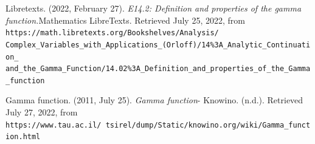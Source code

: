 \documentclass[12pt]{report}
\begin{document}
\begin{thebibliography}{9}
Libretexts. (2022, February 27). \textit{E14.2: Definition and properties of the gamma function.}Mathematics LibreTexts. Retrieved July 25, 2022, from \texttt{https://math.libretexts.org/Bookshelves/Analysis/\\Complex\_Variables\_with\_Applications\_(Orloff)/14\%3A\_Analytic\_Continuation\_\\and\_the\_Gamma\_Function/14.02\%3A\_Definition\_and\_properties\_of\_the\_Gamma\_function}

Gamma function. (2011, July 25). \textit{Gamma function}- Knowino. (n.d.). Retrieved July 27, 2022, from\\ \texttt{https://www.tau.ac.il/~tsirel/dump/Static/knowino.org/wiki/Gamma\_function.html}

\end{thebibliography}
\end{document}

